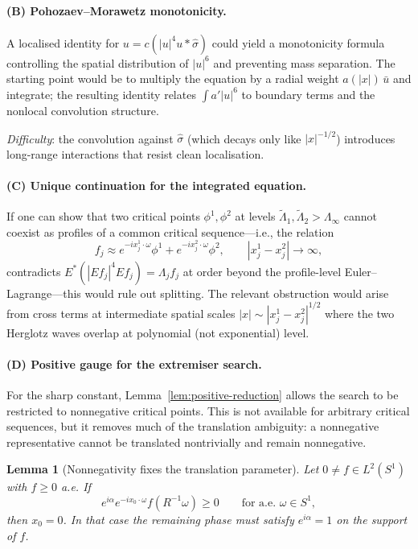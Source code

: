 \documentclass[12pt]{article}
\newtheorem{lemma}[theorem]{Lemma}
\theoremstyle{definition}
\theoremstyle{remark}
\newcommand{\wh}{\widehat}
\begin{document}
\paragraph{(B) Pohozaev--Morawetz monotonicity.}
A localised identity for $u=c(|u|^4u\ast\wh\sigma)$ could yield
a monotonicity formula controlling the spatial distribution of
$|u|^6$ and preventing mass separation.  The starting point would be
to multiply the equation by a radial weight $a(|x|)\,\bar u$ and
integrate; the resulting identity relates $\int a'|u|^6$ to boundary
terms and the nonlocal convolution structure.

\emph{Difficulty}: the convolution against $\wh\sigma$ (which decays
only like $|x|^{-1/2}$) introduces long-range interactions that
resist clean localisation.

\paragraph{(C) Unique continuation for the integrated equation.}
If one can show that two critical points $\phi^1,\phi^2$ at levels
$\widetilde\Lambda_1,\widetilde\Lambda_2>\Lambda_\infty$ cannot
coexist as profiles of a common critical sequence---i.e., the
relation
\[
  f_j\approx e^{-ix_j^1\cdot\omega}\phi^1+e^{-ix_j^2\cdot\omega}\phi^2,
  \qquad |x_j^1-x_j^2|\to\infty,
\]
contradicts $E^*(|Ef_j|^4Ef_j)=\Lambda_jf_j$ at order beyond the
profile-level Euler--Lagrange---this would rule out splitting.  The
relevant obstruction would arise from cross terms at intermediate
spatial scales $|x|\sim|x_j^1-x_j^2|^{1/2}$ where the two Herglotz
waves overlap at polynomial (not exponential) level.

\paragraph{(D) Positive gauge for the extremiser search.}
For the sharp constant, Lemma~\ref{lem:positive-reduction} allows the
search to be restricted to nonnegative critical points.  This is not
available for arbitrary critical sequences, but it removes much of the
translation ambiguity: a nonnegative representative cannot be translated
nontrivially and remain nonnegative.

\begin{lemma}[Nonnegativity fixes the translation parameter]
  \label{lem:positive-gauge}
  Let $0\neq f\in L^2(S^1)$ with $f\geq 0$ a.e.  If
  \[
    e^{i\alpha}e^{-ix_0\cdot\omega}f(R^{-1}\omega)\geq 0
    \qquad\text{for a.e. }\omega\in S^1,
  \]
  then $x_0=0$.  In that case the remaining phase must satisfy
  $e^{i\alpha}=1$ on the support of $f$.
\end{lemma}
\end{document}

